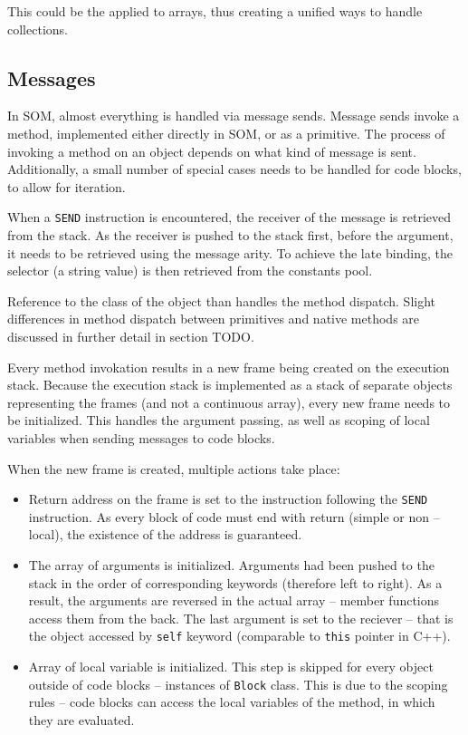 \documentclass[thesis=M,english]{FITthesis}[2019/12/23]
\begin{document}
This could be the applied to arrays, thus creating a unified ways to handle collections.

\subsection{Messages}
In SOM, almost everything is handled via message sends. Message sends invoke a method, implemented either directly in SOM, or as a primitive.
The process of invoking a method on an object depends on what kind of message is sent. Additionally, a small number of special cases needs to
be handled for code blocks, to allow for iteration.

When a \texttt{SEND} instruction is encountered, the receiver of the message is retrieved from the stack. As the receiver is pushed to the stack
first, before the argument, it needs to be retrieved using the message arity. To achieve the late binding, the selector (a string value)
is then retrieved from the constants pool. 

Reference to the class of the object than handles the method dispatch. Slight differences in method dispatch between primitives and native
methods are discussed in further detail in section TODO.

Every method invokation results in a new frame being created on the execution stack. Because the execution stack is implemented as a
stack of separate objects representing the frames (and not a continuous array), every new frame needs to be initialized. This handles
the argument passing, as well as scoping of local variables when sending messages to code blocks.

When the new frame is created, multiple actions take place:
\begin{itemize}
	\item Return address on the frame is set to the instruction following the \texttt{SEND} instruction. As every block of code must end
		with return (simple or non -- local), the existence of the address is guaranteed.
	\item The array of arguments is initialized. Arguments had been pushed to the stack in the order of corresponding keywords (therefore
		left to right). As a result, the arguments are reversed in the actual array -- member functions access them from the back. The
		last argument is set to the reciever -- that is the object accessed by \texttt{self} keyword (comparable to \texttt{this} pointer in
		C++).
	\item Array of local variable is initialized. This step is skipped for every object outside of code blocks -- instances of \texttt{Block}
		class. This is due to the scoping rules -- code blocks can access the local variables of the method, in which they are evaluated.
\end{itemize}
\end{document}
